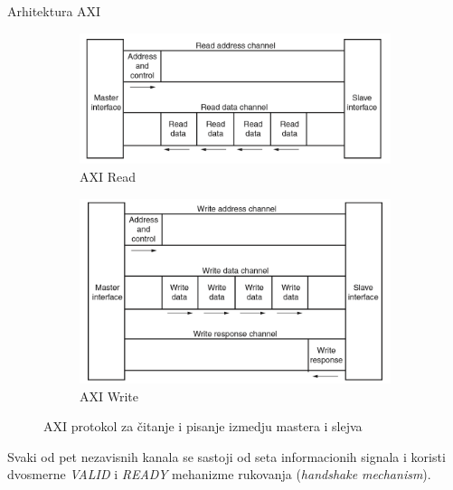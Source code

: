 \documentclass[10pt]{beamer}
\begin{document}
\begin{frame}{Arhitektura AXI}
	
	\begin{figure}
		\centering
		\begin{subfigure}{.5\textwidth}
  			\centering
 			\includegraphics[width=.75\linewidth]{images/axireadprotocol.png}
  			\caption{AXI Read}
  			\label{fig:axiRead}
		\end{subfigure}%
		\begin{subfigure}{.5\textwidth}
  			\centering
  			\includegraphics[width=.75\linewidth]{images/axiwriteprotocol.png}
  			\caption{AXI Write}
  			\label{fig:axiWrite}
		\end{subfigure}
		\caption{AXI protokol za čitanje i pisanje izmedju mastera i slejva}
		\label{fig:axiProtocol}
	\end{figure}
	
	Svaki od pet nezavisnih kanala se sastoji od seta informacionih signala i koristi dvosmerne \textit{VALID} i \textit{READY} mehanizme rukovanja (\textit{handshake mechanism}).
	
\end{frame}
\end{document}
